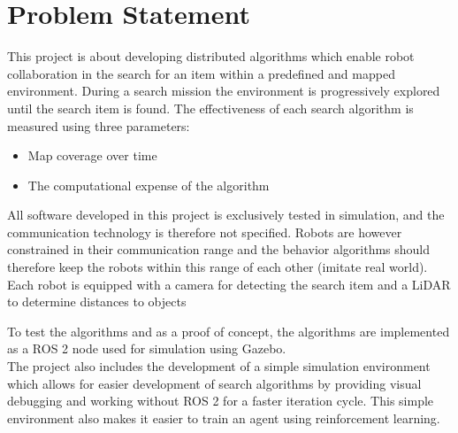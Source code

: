 \section{Problem Statement}
\label{sec:problem-statement}

This project is about developing distributed algorithms which enable robot collaboration in the search for an item within a predefined and mapped environment. During a search mission the environment is progressively explored until the search item is found. The effectiveness of each search algorithm is measured using {\color{red} three} parameters:

\begin{itemize}
    \item Map coverage over time
    \item The computational expense of the algorithm
\end{itemize}

All software developed in this project is exclusively tested in simulation, and the communication technology is therefore not specified. Robots are however constrained in their communication range and the behavior algorithms should therefore keep the robots within this range of each other (imitate real world). Each robot is equipped with a camera for detecting the search item and a LiDAR to determine distances to objects 

To test the algorithms and as a proof of concept, the algorithms are implemented as a ROS 2 node used for simulation using Gazebo. \\

The project also includes the development of a simple simulation environment which allows for easier development of search algorithms by providing visual debugging and working without ROS 2 for a faster iteration cycle. This simple environment also makes it easier to train an agent using reinforcement learning.
